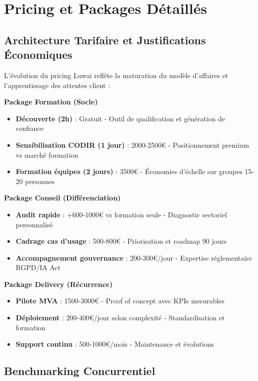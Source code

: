 \section{Pricing et Packages Détaillés}

\subsection{Architecture Tarifaire et Justifications Économiques}

L'évolution du pricing Luwai reflète la maturation du modèle d'affaires et l'apprentissage des attentes client :

\textbf{Package Formation (Socle)}
\begin{itemize}
    \item \textbf{Découverte (2h)} : Gratuit - Outil de qualification et génération de confiance
    \item \textbf{Sensibilisation CODIR (1 jour)} : 2000-2500€ - Positionnement premium vs marché formation
    \item \textbf{Formation équipes (2 jours)} : 3500€ - Économies d'échelle sur groupes 15-20 personnes
\end{itemize}

\textbf{Package Conseil (Différenciation)}
\begin{itemize}
    \item \textbf{Audit rapide} : +600-1000€ vs formation seule - Diagnostic sectoriel personnalisé
    \item \textbf{Cadrage cas d'usage} : 500-800€ - Priorisation et roadmap 90 jours
    \item \textbf{Accompagnement gouvernance} : 200-300€/jour - Expertise réglementaire RGPD/IA Act
\end{itemize}

\textbf{Package Delivery (Récurrence)}
\begin{itemize}
    \item \textbf{Pilote MVA} : 1500-3000€ - Proof of concept avec KPIs mesurables
    \item \textbf{Déploiement} : 200-400€/jour selon complexité - Standardisation et formation
    \item \textbf{Support continu} : 500-1000€/mois - Maintenance et évolutions
\end{itemize}

\subsection{Benchmarking Concurrentiel}

